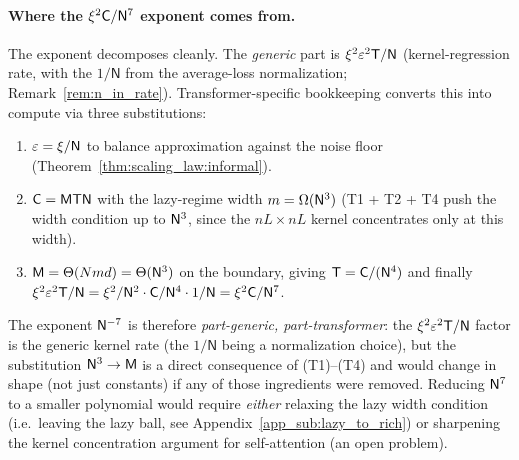 \documentclass[11pt]{article}
\theoremstyle{plain}
\begin{document}
\paragraph{Where the $\xi^2{\sf C}/{\sf N}^7$ exponent comes from.}
The exponent decomposes cleanly. The {\it generic} part is $\xi^2 \varepsilon^2 {\sf T}/\mathsf{N}$ (kernel-regression rate, with the $1/\mathsf{N}$ from the average-loss normalization; Remark~\ref{rem:n_in_rate}). Transformer-specific bookkeeping converts this into compute via three substitutions:
\begin{enumerate}
    \item[(S1)] $\varepsilon = \xi/{\sf N}$ to balance approximation against the noise floor (Theorem~\ref{thm:scaling_law:informal}).
    \item[(S2)] ${\sf C} = {\sf MTN}$ with the lazy-regime width $m=\Omega({\sf N}^3)$ (T1 + T2 + T4 push the width condition up to ${\sf N}^3$, since the $nL\times nL$ kernel concentrates only at this width).
    \item[(S3)] ${\sf M}=\Theta(Nmd) = \Theta({\sf N}^3)$ on the boundary, giving ${\sf T} = {\sf C}/({\sf N}^4)$ and finally $\xi^2 \varepsilon^2 {\sf T}/\mathsf{N} = \xi^2/{\sf N}^2 \cdot {\sf C}/{\sf N}^4 \cdot 1/\mathsf{N} = \xi^2 {\sf C}/{\sf N}^7$.
\end{enumerate}
The exponent ${\sf N}^{-7}$ is therefore {\it part-generic, part-transformer}: the $\xi^2 \varepsilon^2 {\sf T}/\mathsf{N}$ factor is the generic kernel rate (the $1/\mathsf{N}$ being a normalization choice), but the substitution ${\sf N}^3 \to {\sf M}$ is a direct consequence of (T1)--(T4) and would change in shape (not just constants) if any of those ingredients were removed. Reducing ${\sf N}^7$ to a smaller polynomial would require {\it either} relaxing the lazy width condition (i.e.\ leaving the lazy ball, see Appendix~\ref{app_sub:lazy_to_rich}) or sharpening the kernel concentration argument for self-attention (an open problem).
\end{document}
